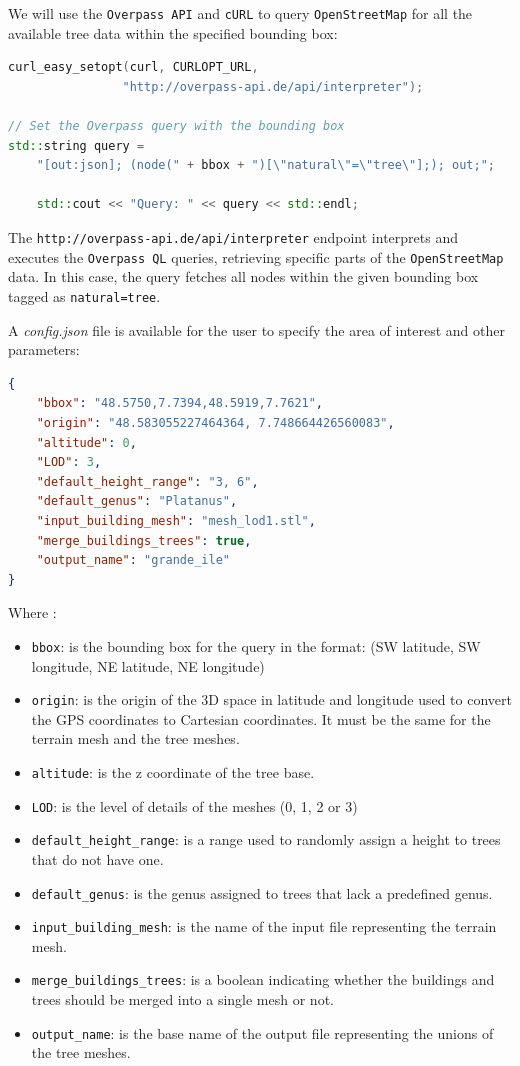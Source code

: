 \documentclass[12pt]{article}
\begin{document}
We will use the \texttt{Overpass API} and \texttt{cURL} to query
\texttt{OpenStreetMap} for all the available tree data within the specified
bounding box:

\begin{lstlisting}[language=C++]
curl_easy_setopt(curl, CURLOPT_URL,
                "http://overpass-api.de/api/interpreter");

// Set the Overpass query with the bounding box
std::string query =
    "[out:json]; (node(" + bbox + ")[\"natural\"=\"tree\"];); out;";

    std::cout << "Query: " << query << std::endl;
\end{lstlisting}

The \texttt{http://overpass-api.de/api/interpreter} endpoint interprets and
executes the \texttt{Overpass QL}\cite{overpass-ql} queries, retrieving
specific parts of the \texttt{OpenStreetMap} data. In this case, the query
fetches all nodes within the given bounding box tagged as \texttt{natural=tree}.

A \textit{config.json} file is available for the user to specify the area of
interest and other parameters:

\begin{lstlisting}[language=json]
{
    "bbox": "48.5750,7.7394,48.5919,7.7621",
    "origin": "48.583055227464364, 7.748664426560083",
    "altitude": 0,
    "LOD": 3,
    "default_height_range": "3, 6",
    "default_genus": "Platanus",
    "input_building_mesh": "mesh_lod1.stl",
    "merge_buildings_trees": true,
    "output_name": "grande_ile"
}
\end{lstlisting}

Where :
\begin{itemize}
    \item \texttt{bbox}: is the bounding box for the query in the format:
    \subitem (SW latitude, SW longitude, NE latitude, NE longitude)
    \item \texttt{origin}: is the origin of the 3D space in latitude and longitude
    used to convert the GPS coordinates to Cartesian coordinates. It must be the
    same for the terrain mesh and the tree meshes.
    \item \texttt{altitude}: is the z coordinate of the tree base.
    \item \texttt{LOD}: is the level of details of the meshes (0, 1, 2 or 3)
    \item \texttt{default\_height\_range}: is a range used to randomly assign a
    height to trees that do not have one.
    \item \texttt{default\_genus}: is the genus assigned to trees that lack a
    predefined genus.
    \item \texttt{input\_building\_mesh}: is the name of the input file
    representing the terrain mesh.
    \item \texttt{merge\_buildings\_trees}: is a boolean indicating whether the
    buildings and trees should be merged into a single mesh or not.
    \item \texttt{output\_name}: is the base name of the output file
    representing the unions of the tree meshes.
\end{itemize}
\end{document}
